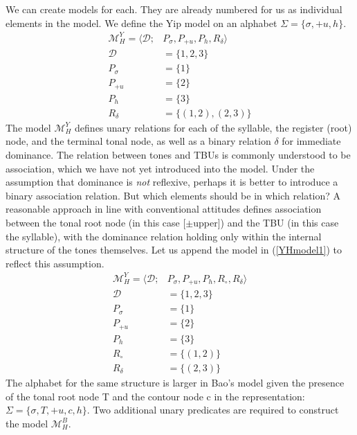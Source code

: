 \documentclass{article}
\begin{document}
We can create models for each. They are already numbered for us as individual elements in the model. We define the Yip model on an alphabet $\Sigma = \{\sigma, +u, h\}$. 
\begin{equation} \label{YHmodel1}
\begin{split}
\mathcal{M}^{Y}_{H} = \langle \mathcal{D}; &P_{\sigma}, P_{+u}, P_{h}, R_{\delta} \rangle \\
\mathcal{D} &= \{1, 2, 3\} \\
P_{\sigma} &= \{1\} \\
P_{+u} &= \{2\} \\
P_{h} &= \{3\} \\
R_{\delta} &= \{(1,2), (2,3)\} 
\end{split}
\end{equation}
The model $\mathcal{M}^{Y}_{H}$ defines unary relations for each of the syllable, the register (root) node, and the terminal tonal node, as well as a binary relation $\delta$ for immediate dominance. The relation between tones and TBUs is commonly understood to be association, which we have not yet introduced into the model. Under the assumption that dominance is \emph{not} reflexive, perhaps it is better to introduce a binary association relation. But which elements should be in which relation? A reasonable approach in line with conventional attitudes defines association between the tonal root node (in this case [$\pm$upper]) and the TBU (in this case the syllable), with the dominance relation holding only within the internal structure of the tones themselves. Let us append the model in (\ref{YHmodel1}) to reflect this assumption.
 \begin{equation}
\begin{split}
\mathcal{M}^{Y}_{H} = \langle \mathcal{D}; &P_{\sigma}, P_{+u}, P_{h}, R_{\circ}, R_{\delta} \rangle \\
\mathcal{D} &= \{1, 2, 3\} \\
P_{\sigma} &= \{1\} \\
P_{+u} &= \{2\} \\
P_{h} &= \{3\} \\
R_{\circ} &= \{(1,2)\}  \\
R_{\delta} &= \{(2,3)\} 
\end{split}
\end{equation}
The alphabet for the same structure is larger in Bao's model given the presence of the tonal root node T and the contour node c in the representation: $\Sigma = \{\sigma, T, +u, c, h\}$. Two additional unary predicates are required to construct the model $\mathcal{M}^{B}_{H}$.
\end{document}

